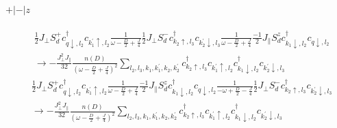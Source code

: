\documentclass[12pt]{revtex4-2}
\begin{document}
\paragraph{\(+|-|z\)}
\begin{equation}\begin{aligned}
	&\frac{1}{2}J_\perp S_d^+ c^\dagger_{q \downarrow, l_2}c_{k_1^\prime \uparrow, l_2}\frac{1}{\omega - \frac{D}{2} + \frac{J}{4}}\frac{1}{2}J_\perp S_d^- c^\dagger_{k_2 \uparrow, l_3}c_{k_2^\prime \downarrow, l_3} \frac{1}{\omega - \frac{D}{2} + \frac{J}{4}} \frac{-1}{2}J_\parallel S_d^z c^\dagger_{k_1 \downarrow, l_2} c_{q \downarrow, l_2} \\
	&\longrightarrow -\frac{J_\perp^2 J_\parallel}{32} \frac{n(D)}{\left(\omega - \frac{D}{2} + \frac{J}{4}\right)^2}\sum_{l_2, l_3, k_1,k_1^\prime,k_2,k_2^\prime}c^\dagger_{k_2 \uparrow, l_3}c_{k_1^\prime \uparrow, l_2}c^\dagger_{k_1 \downarrow, l_2}c_{k_2^\prime \downarrow, l_3}
\end{aligned}\end{equation}
\begin{equation}\begin{aligned}
	&\frac{1}{2}J_\perp S_d^+ c^\dagger_{q \downarrow, l_2}c_{k_1^\prime \uparrow, l_2} \frac{1}{\omega - \frac{D}{2} + \frac{J}{4}} \frac{-1}{2}J_\parallel S_d^z c^\dagger_{k_1 \downarrow, l_2} c_{q \downarrow, l_2} \frac{1}{-\omega + \frac{D}{2} - \frac{J}{4}}\frac{1}{2}J_\perp S_d^- c^\dagger_{k_2 \uparrow, l_3}c_{k_2^\prime \downarrow, l_3}\\
	&\longrightarrow -\frac{J_\perp^2 J_\parallel}{32} \frac{n(D)}{\left(\omega - \frac{D}{2} + \frac{J}{4}\right)^2}\sum_{l_2, l_3, k_1,k_1^\prime,k_2,k_2^\prime}c^\dagger_{k_2 \uparrow, l_3}c_{k_1^\prime \uparrow, l_2}c^\dagger_{k_1 \downarrow, l_2}c_{k_2^\prime \downarrow, l_3}
\end{aligned}\end{equation}
\end{document}
